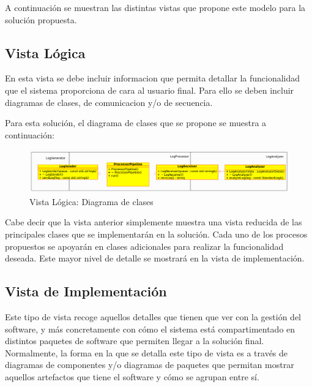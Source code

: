 \documentclass[11pt]{article}
\begin{document}
A continuación se muestran las distintas vistas que propone este modelo para la solución propuesta.

\subsection{Vista Lógica}

En esta vista se debe incluir informacion que permita detallar la funcionalidad que el sistema proporciona de cara al usuario final. Para ello se deben incluir diagramas de clases, de comunicacion y/o de secuencia.

Para esta solución, el diagrama de clases que se propone se muestra a continuación:

\begin{center}
 \begin{figure}[H]
 \begin{center}
   \includegraphics[width=15cm]{img/classes_summary01.png}
   \caption{Vista Lógica: Diagrama de clases}
   \label{fig:4plus1views}
 \end{center}
 \end{figure}
\end{center}

Cabe decir que la vista anterior simplemente muestra una vista reducida de las principales clases que se implementarán en la solución. Cada uno de los procesos propuestos se apoyarán en clases adicionales para realizar la funcionalidad deseada. Este mayor nivel de detalle se mostrará en la vista de implementación.

\subsection{Vista de Implementación}

Este tipo de vista recoge aquellos detalles que tienen que ver con la gestión del software, y más concretamente con cómo el sistema está compartimentado en distintos paquetes de software que permiten llegar a la solución final. Normalmente, la forma en la que se detalla este tipo de vista es a través de diagramas de componentes y/o diagramas de paquetes que permitan mostrar aquellos artefactos que tiene el software y cómo se agrupan entre sí.
\end{document}
